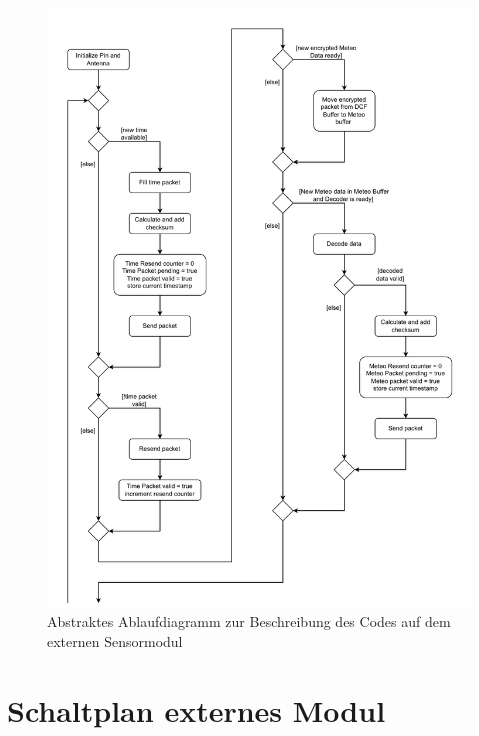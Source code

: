 \documentclass[a4paper,11pt]{article}
\begin{document}
\begin{figure}[H]
  \centering
  \includegraphics[scale=0.75, page=3]{Ablauf extern.pdf}
  \caption{Abstraktes Ablaufdiagramm zur Beschreibung des Codes auf dem externen Sensormodul}
  \label{pdf:ablaufExtern}
\end{figure}

\newpage
\section{Schaltplan externes Modul}
\end{document}
